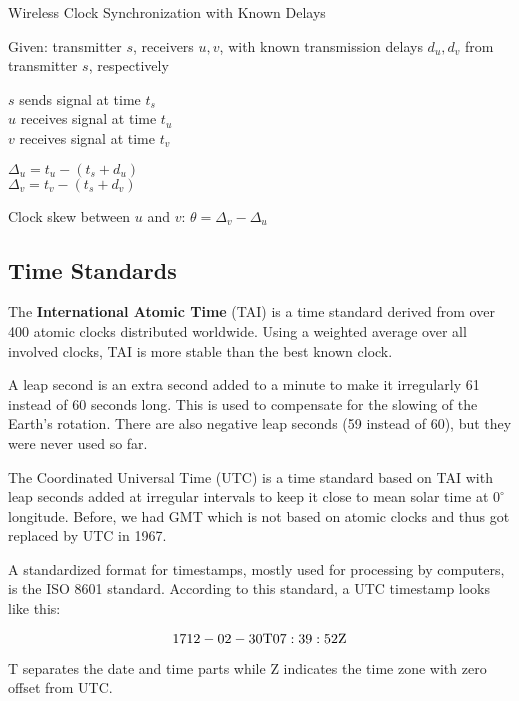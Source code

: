 \begin{algorithm}[H]
\caption{Wireless Clock Synchronization with Known Delays}
	Given: transmitter $s$, receivers $u, v$, with known transmission delays $d_u, d_v$ from transmitter $s$, respectively
	
	\BlankLine
	
	$s$ sends signal at time $t_s$ \\
	$u$ receives signal at time $t_u$ \\
	$v$ receives signal at time $t_v$ \\
	
	\BlankLine
	
	$\Delta_u = t_u - (t_s + d_u)$ \\
	$\Delta_v = t_v - (t_s + d_v)$ \\
	
	\BlankLine
	
	Clock skew between $u$ and $v$: $\theta = \Delta_v - \Delta_u$
\end{algorithm}


\subsection{Time Standards}

The \textbf{International Atomic Time} (TAI) is a time standard derived from over 400 atomic clocks distributed worldwide. Using a weighted average over all involved clocks, TAI is more stable than the best known clock. \medskip

A leap second is an extra second added to a minute to make it irregularly 61 instead of 60 seconds long. This is used to compensate for the slowing of the Earth’s rotation. There are also negative leap seconds (59 instead of 60), but they were never used so far. \medskip

The Coordinated Universal Time (UTC) is a time standard based on TAI with leap seconds added at irregular intervals to keep it close to mean solar time at $0^\circ$ longitude. Before, we had GMT which is not based on atomic clocks and thus got replaced by UTC in 1967. \medskip

A standardized format for timestamps, mostly used for processing by computers, is the ISO 8601 standard. According to this standard, a UTC timestamp looks like this: 

$$1712-02-30 \text T 07:39:52 \text Z$$

T separates the date and time parts while Z indicates the time zone with zero offset from UTC.


